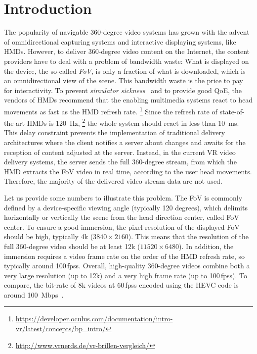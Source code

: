 \section{Introduction}
\label{sec:introduction}


The popularity of navigable 360-degree video systems
has grown with the advent of omnidirectional capturing systems
and interactive displaying
systems, like \acp{HMD}.
However, to deliver 360-degree video content on the Internet, the content providers
have to deal with a problem of bandwidth waste: What is displayed on the device,
the so-called \textit{\ac{FoV}}, is only a fraction of what is downloaded, which is an omnidirectional view of the scene.
This bandwidth waste is the price to pay for interactivity.
To prevent \emph{simulator sickness}~\cite{moss2011characteristics}
and to provide good \ac{QoE}, the vendors of \acp{HMD} recommend that the enabling multimedia
systems react
to head movements as fast as the \ac{HMD}
refresh rate.%
\footnote{\url{https://developer.oculus.com/documentation/intro-vr/latest/concepts/bp_intro/}}
Since the refresh rate of
state-of-the-art \acp{HMD} is \SI{120}{Hz},%
\footnote{\url{http://www.vrnerds.de/vr-brillen-vergleich/}}
the whole system should react in less than
\SI{10}{ms}. This delay constraint prevents the implementation of traditional delivery
architectures where the client notifies a server about changes and awaits for the reception
of content adjusted at the server. Instead, in the current \ac{VR} video delivery systems, the server sends the
full 360-degree stream, from which the \ac{HMD}
extracts the \ac{FoV} video in real time, according to the user head movements. Therefore, the majority of the delivered video stream data are not used.

Let us provide some numbers to illustrate this problem.
The \ac{FoV} is commonly defined by
a device-specific viewing angle (typically 120 degrees), which delimits horizontally or
vertically the scene from the head direction center, called \ac{FoV} center. To ensure a good
immersion, the pixel
resolution of
the displayed \ac{FoV} should be high, typically 4k ($3840\times2160$). This means that
the resolution of the full 360-degree video should be at least 12k ($11520\times6480$).
In addition, the immersion requires a video frame rate on the order of the HMD refresh rate, so
typically around 100\,\acp{fps}.
Overall, high-quality 360-degree videos combine both a very large resolution (up to 12k)
and a very high frame rate (up to 100\,\acp{fps}). To compare, the bit-rate of 8k videos
at 60\,\acp{fps} encoded using the \ac{HEVC} code is around \SI{100}{Mbps}~\cite{7398367}.


